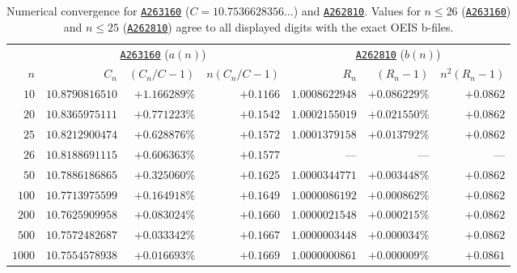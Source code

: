 \documentclass[11pt,a4paper]{article}
\theoremstyle{remark}
\newcommand{\oeis}[1]{\href{https://oeis.org/#1}{\texttt{#1}}}
\begin{document}
\begin{table}[ht]
\centering
\small
\caption{Numerical convergence for \oeis{A263160} ($C = 10.7536628356\ldots$) and \oeis{A262810}. Values for $n\le 26$ (\oeis{A263160}) and $n\le 25$ (\oeis{A262810}) agree to all displayed digits with the exact OEIS b-files.}
\label{tab:numerics}
\begin{tabular}{@{}r r r r | r r r@{}}
\toprule
 & \multicolumn{3}{c|}{\oeis{A263160} ($a(n)$)} & \multicolumn{3}{c}{\oeis{A262810} ($b(n)$)} \\
\cmidrule(lr){2-4}\cmidrule(l){5-7}
$n$ & $C_n$ & $(C_n/C - 1)$ & $n(C_n/C - 1)$ & $R_n$ & $(R_n - 1)$ & $n^2(R_n - 1)$ \\
\midrule
$10$   & $10.8790816510$ & $+1.166289\%$ & $+0.1166$ & $1.0008622948$ & $+0.086229\%$ & $+0.0862$ \\
$20$   & $10.8365975111$ & $+0.771223\%$ & $+0.1542$ & $1.0002155019$ & $+0.021550\%$ & $+0.0862$ \\
$25$   & $10.8212900474$ & $+0.628876\%$ & $+0.1572$ & $1.0001379158$ & $+0.013792\%$ & $+0.0862$ \\
$26$   & $10.8188691115$ & $+0.606363\%$ & $+0.1577$ & ---            & ---           & ---       \\
$50$   & $10.7886186865$ & $+0.325060\%$ & $+0.1625$ & $1.0000344771$ & $+0.003448\%$ & $+0.0862$ \\
$100$  & $10.7713975599$ & $+0.164918\%$ & $+0.1649$ & $1.0000086192$ & $+0.000862\%$ & $+0.0862$ \\
$200$  & $10.7625909958$ & $+0.083024\%$ & $+0.1660$ & $1.0000021548$ & $+0.000215\%$ & $+0.0862$ \\
$500$  & $10.7572482687$ & $+0.033342\%$ & $+0.1667$ & $1.0000003448$ & $+0.000034\%$ & $+0.0862$ \\
$1000$ & $10.7554578938$ & $+0.016693\%$ & $+0.1669$ & $1.0000000861$ & $+0.000009\%$ & $+0.0861$ \\
\bottomrule
\end{tabular}
\end{table}
\end{document}
